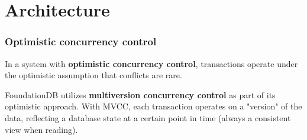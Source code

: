 \section{Architecture}

\begin{frame}
	\frametitle{Optimistic concurrency control}
 In a system with \textbf{optimistic concurrency control}, transactions operate under the optimistic assumption that conflicts are rare. 
\vspace{0.5cm}

FoundationDB utilizes \textbf{multiversion concurrency control} as part of its optimistic approach. With MVCC, each transaction operates on a "version" of the data, reflecting a database state at a certain point in time (always a consistent view when reading).
\end{frame}



